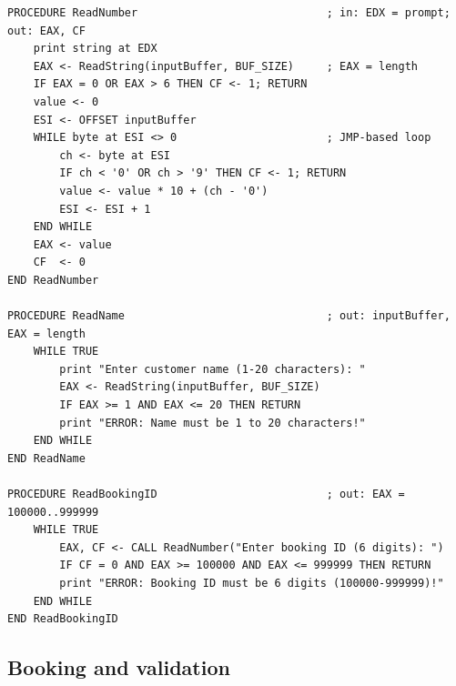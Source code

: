 \documentclass{thesis-library}
\begin{document}
\begin{lstlisting}
PROCEDURE ReadNumber                             ; in: EDX = prompt; out: EAX, CF
    print string at EDX
    EAX <- ReadString(inputBuffer, BUF_SIZE)     ; EAX = length
    IF EAX = 0 OR EAX > 6 THEN CF <- 1; RETURN
    value <- 0
    ESI <- OFFSET inputBuffer
    WHILE byte at ESI <> 0                       ; JMP-based loop
        ch <- byte at ESI
        IF ch < '0' OR ch > '9' THEN CF <- 1; RETURN
        value <- value * 10 + (ch - '0')
        ESI <- ESI + 1
    END WHILE
    EAX <- value
    CF  <- 0
END ReadNumber

PROCEDURE ReadName                               ; out: inputBuffer, EAX = length
    WHILE TRUE
        print "Enter customer name (1-20 characters): "
        EAX <- ReadString(inputBuffer, BUF_SIZE)
        IF EAX >= 1 AND EAX <= 20 THEN RETURN
        print "ERROR: Name must be 1 to 20 characters!"
    END WHILE
END ReadName

PROCEDURE ReadBookingID                          ; out: EAX = 100000..999999
    WHILE TRUE
        EAX, CF <- CALL ReadNumber("Enter booking ID (6 digits): ")
        IF CF = 0 AND EAX >= 100000 AND EAX <= 999999 THEN RETURN
        print "ERROR: Booking ID must be 6 digits (100000-999999)!"
    END WHILE
END ReadBookingID
\end{lstlisting}

\subsection{Booking and validation}
\end{document}
